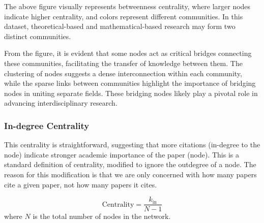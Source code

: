 \documentclass{article}
\begin{document}
The above figure visually represents betweenness centrality, where larger nodes indicate higher centrality, and colors represent different communities. In this dataset, theoretical-based and mathematical-based research may form two distinct communities.  

From the figure, it is evident that some nodes act as critical bridges connecting these communities, facilitating the transfer of knowledge between them. The clustering of nodes suggests a dense interconnection within each community, while the sparse links between communities highlight the importance of bridging nodes in uniting separate fields. These bridging nodes likely play a pivotal role in advancing interdisciplinary research.

\subsubsection{In-degree Centrality}
This centrality is straightforward, suggesting that more citations (in-degree to the node) indicate stronger academic importance of the paper (node). This is a standard definition of centrality, modified to ignore the outdegree of a node. The reason for this modification is that we are only concerned with how many papers cite a given paper, not how many papers it cites.
 
\[
\text{Centrality} = \frac{k_{\text{in}}}{N - 1}
\]
where \(N\) is the total number of nodes in the network.
\end{document}
